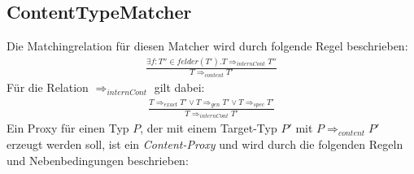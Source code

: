 \documentclass[a4paper,12pt]{article}
\begin{document}
\subsection{ContentTypeMatcher}
Die Matchingrelation für diesen Matcher wird durch folgende Regel beschrieben:
\begin{gather*}
\frac{\exists f:T''\in felder(T'). T \Rightarrow_{internCont} T''}{T \Rightarrow_{content} T'}
\end{gather*}
Für die Relation $\Rightarrow_{internCont}$ gilt dabei:
\begin{gather*}
\frac{T \Rightarrow_{exact} T' \vee T \Rightarrow_{gen} T' \vee
T \Rightarrow_{spec} T'  }{T \Rightarrow_{internCont} T'}
\end{gather*}
Ein Proxy für einen Typ $P$, der mit einem Target-Typ $P'$ mit $P \Rightarrow_{content} P'$ erzeugt werden soll, ist ein \emph{Content-Proxy} und wird durch die folgenden Regeln und Nebenbedingungen beschrieben:
\end{document}
